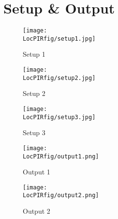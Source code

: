 \section{Setup \& Output}
\begin{figure}[hpt]
  \centering
    \texttt{[image: \\LocPIRfig/setup1.jpg]}
    \label{fig:set1} \hfill
  \caption{Setup 1}
\end{figure}
\begin{figure}[hpt]
  \centering
    \texttt{[image: \\LocPIRfig/setup2.jpg]}
    \label{fig:set2} \hfill
  \caption{Setup 2}
\end{figure}
\begin{figure}[hpt]
  \centering
    \texttt{[image: \\LocPIRfig/setup3.jpg]}
    \label{fig:set3} \hfill
  \caption{Setup 3}
\end{figure}
\begin{figure}[hpt]
  \centering
    \texttt{[image: \\LocPIRfig/output1.png]}
    \label{fig:out1} \hfill
  \caption{Output 1}
\end{figure}
\begin{figure}[hpt]
  \centering
    \texttt{[image: \\LocPIRfig/output2.png]}
    \label{fig:out2} \hfill
  \caption{Output 2}
\end{figure}














